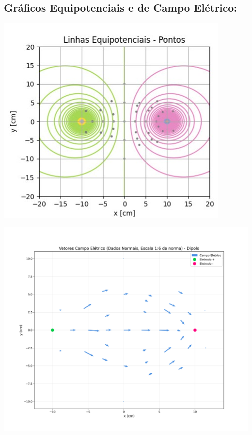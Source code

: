 \documentclass[column,brazilian,12pt,a4paper,final]{article}
\begin{document}
\subsection{Gráficos Equipotenciais e de Campo Elétrico:}

    \centering
    \begin{minipage}{0.48\textwidth}
        \centering
        \includegraphics[width=\linewidth]{EP1.jpg}
        
        \label{fig:imagem1}
    \end{minipage} \hfill
    \begin{minipage}{0.48\textwidth}
        \centering
        \includegraphics[width=\linewidth]{Campo DipoloN.png}
        \label{fig:imagem2}
    \end{minipage}
    
\end{document}
